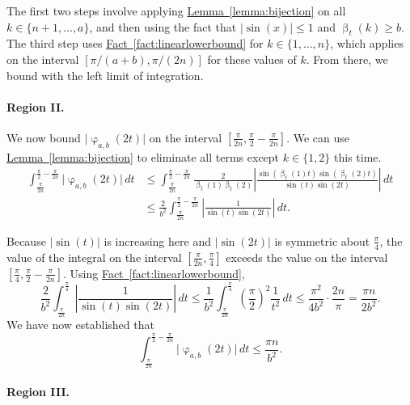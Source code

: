 \documentclass[11pt]{article}
\numberwithin{equation}{section}
\theoremstyle{definition}
\theoremstyle{plain}
\newcommand{\expref}[2]{\hyperref[#2]{#1~\ref{#2}}}
\DeclareMathOperator{\charfn}{\varphi}
\DeclareMathOperator{\bij}{\beta}
\begin{document}
The first two steps involve applying \expref{Lemma}{lemma:bijection} on all $k \in \{n+1,\dots,a\}$, and then using the fact that $\lvert\sin(x)\rvert\le 1$ and $\bij_t(k)\ge b$. The third step uses \expref{Fact}{fact:linearlowerbound} for $k \in \{1,\dots,n\}$, which applies on the interval $[\pi/(a+b),\pi/(2n)]$ for these values of $k$. From there, we bound with the left limit of integration.

\paragraph{Region II.}

We now bound $\lvert\charfn_{a,b}(2t)\rvert$ on the interval $[\frac{\pi}{2n},\frac{\pi}{2}-\frac{\pi}{2n}]$. We can use \expref{Lemma}{lemma:bijection} to eliminate all terms except $k \in \{1,2\}$ this time.
\begin{align*}
    \int_{\frac{\pi}{2n}}^{\frac{\pi}{2}-\frac{\pi}{2n}} \lvert\charfn_{a,b}(2t)\rvert\,dt &\le \int_{\frac{\pi}{2n}}^{\frac{\pi}{2}-\frac{\pi}{2n}} \frac{2}{\bij_t(1)\bij_t(2)} \left\lvert\frac{\sin(\bij_t(1)t)\sin(\bij_t(2)t)}{\sin(t)\sin(2t)} \right\rvert\,dt\\
    &\le \frac{2}{b^2}\int_{\frac{\pi}{2n}}^{\frac{\pi}{2}-\frac{\pi}{2n}} \left\lvert\frac{1}{\sin(t)\sin(2t)} \right\rvert\,dt.
\end{align*}

Because $\lvert\sin(t)\rvert$ is increasing here and $\lvert\sin(2t)\rvert$ is symmetric about $\frac{\pi}{4}$, the value of the integral on the interval $[\frac{\pi}{2n},\frac{\pi}{4}]$ exceeds the value on the interval $[\frac{\pi}{4},\frac{\pi}{2}-\frac{\pi}{2n}]$. Using \expref{Fact}{fact:linearlowerbound},
\[\frac{2}{b^2}\int_{\frac{\pi}{2n}}^{\frac{\pi}{4}} \left\lvert\frac{1}{\sin(t)\sin(2t)} \right\rvert\,dt
\le \frac{1}{b^2}\int_{\frac{\pi}{2n}}^{\frac{\pi}{4}} \left(\frac{\pi}{2}\right)^2 \frac{1}{t^2}\,dt
\le  \frac{\pi^2}{4b^2}\cdot \frac{2n}{\pi}
=\frac{\pi n}{2b^2}.\]
We have now established that
\[\int_{\frac{\pi}{2n}}^{\frac{\pi}{2}-\frac{\pi}{2n}} \lvert\charfn_{a,b}(2t)\rvert\,dt \le \frac{\pi n}{b^2}.\]

\paragraph{Region III.}
\end{document}
